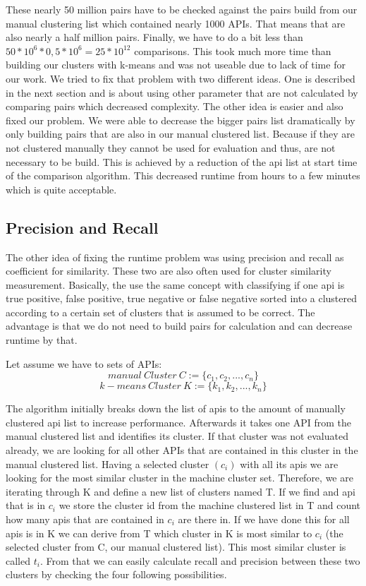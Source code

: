 \documentclass[a4paper]{IEEEtran}
\begin{document}
These nearly 50 million pairs have to be checked against the pairs build from our manual clustering list which contained nearly 1000 APIs. That means that are also nearly a half million pairs. Finally, we have to do a bit less than $50*10^6*0,5*10^6=25*10^{12}$ comparisons. This took much more time than building our clusters with k-means and was not useable due to lack of time for our work.
We tried to fix that problem with two different ideas. One is described in the next section and is about using other parameter that are not calculated by comparing pairs which decreased complexity. The other idea is easier and also fixed our problem. We were able to decrease the bigger pairs list dramatically by only building pairs that are also in our manual clustered list. Because if they are not clustered manually they cannot be used for evaluation and thus, are not necessary to be build. This is achieved by a reduction of the api list at start time of the comparison algorithm. This decreased runtime from hours to a few minutes which is quite acceptable.

\subsection{Precision and Recall}
The other idea of fixing the runtime problem was using precision and recall as coefficient for similarity. These two are also often used for cluster similarity measurement. Basically, the use the same concept with classifying if one api is true positive, false positive, true negative or false negative sorted into a clustered according to a certain set of clusters that is assumed to be correct. The advantage is that we do not need to build pairs for calculation and can decrease runtime by that.

Let assume we have to sets of APIs:
\begin{equation*}
manual~Cluster~C := \{ c_1,c_2,...,c_n \}
\end{equation*}
\begin{equation*}
k-means~Cluster~K := \{ k_1,k_2,...,k_n \}
\end{equation*}

The algorithm initially breaks down the list of apis to the amount of manually clustered api list to increase performance. 
Afterwards it takes one API from the manual clustered list and identifies its cluster. If that cluster was not evaluated already, we are looking for all other APIs that are contained in this cluster in the manual clustered list. Having a selected cluster $(c_i)$ with all its apis we are looking for the most similar cluster in the machine cluster set. Therefore, we are iterating through K and define a new list of clusters named T. If we find and api that is in $c_i$ we store the cluster id from the machine clustered list in T and count how many apis that are contained in $c_i$ are there in. If we have done this for all apis is in K we can derive from T which cluster in K is most similar to $c_i$ (the selected cluster from C, our manual clustered list). This most similar cluster is called $t_i$. From that we can easily calculate recall and precision between these two clusters by checking the four following possibilities.
\end{document}
